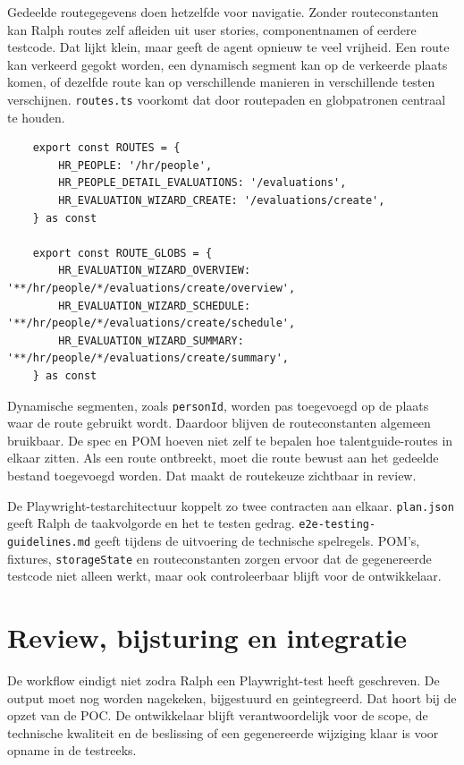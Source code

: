 Gedeelde routegegevens doen hetzelfde voor navigatie. Zonder routeconstanten kan Ralph routes zelf afleiden uit user stories, componentnamen of eerdere testcode. Dat lijkt klein, maar geeft de agent opnieuw te veel vrijheid. Een route kan verkeerd gegokt worden, een dynamisch segment kan op de verkeerde plaats komen, of dezelfde route kan op verschillende manieren in verschillende testen verschijnen. \texttt{routes.ts} voorkomt dat door routepaden en globpatronen centraal te houden.

\begin{verbatim}
    export const ROUTES = {
        HR_PEOPLE: '/hr/people',
        HR_PEOPLE_DETAIL_EVALUATIONS: '/evaluations',
        HR_EVALUATION_WIZARD_CREATE: '/evaluations/create',
    } as const
    
    export const ROUTE_GLOBS = {
        HR_EVALUATION_WIZARD_OVERVIEW: '**/hr/people/*/evaluations/create/overview',
        HR_EVALUATION_WIZARD_SCHEDULE: '**/hr/people/*/evaluations/create/schedule',
        HR_EVALUATION_WIZARD_SUMMARY: '**/hr/people/*/evaluations/create/summary',
    } as const
\end{verbatim}

Dynamische segmenten, zoals \texttt{personId}, worden pas toegevoegd op de plaats waar de route gebruikt wordt. Daardoor blijven de routeconstanten algemeen bruikbaar. De spec en POM hoeven niet zelf te bepalen hoe talentguide-routes in elkaar zitten. Als een route ontbreekt, moet die route bewust aan het gedeelde bestand toegevoegd worden. Dat maakt de routekeuze zichtbaar in review.

De Playwright-testarchitectuur koppelt zo twee contracten aan elkaar. \texttt{plan.json} geeft Ralph de taakvolgorde en het te testen gedrag. \texttt{e2e-testing-guidelines.md} geeft tijdens de uitvoering de technische spelregels. POM's, fixtures, \texttt{storageState} en routeconstanten zorgen ervoor dat de gegenereerde testcode niet alleen werkt, maar ook controleerbaar blijft voor de ontwikkelaar.

\section{Review, bijsturing en integratie}

De workflow eindigt niet zodra Ralph een Playwright-test heeft geschreven. De output moet nog worden nagekeken, bijgestuurd en geintegreerd. Dat hoort bij de opzet van de POC. De ontwikkelaar blijft verantwoordelijk voor de scope, de technische kwaliteit en de beslissing of een gegenereerde wijziging klaar is voor opname in de testreeks.

